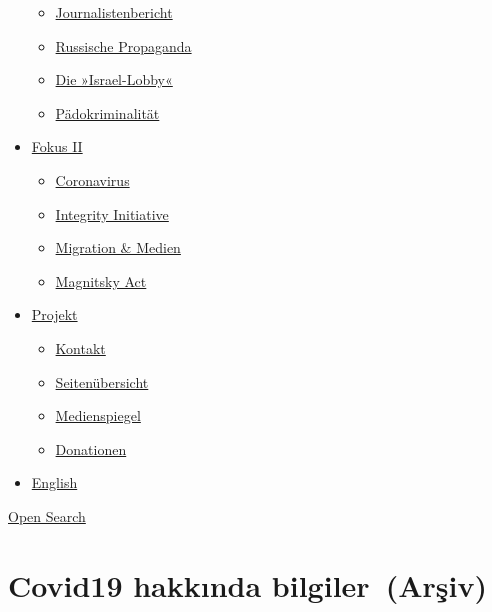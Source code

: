 \begin{itemize}
  \begin{itemize}
  \tightlist
  \item
    \href{https://swprs.org/bericht-eines-journalisten/}{Journalistenbericht}
  \item
    \href{https://swprs.org/russische-propaganda/}{Russische Propaganda}
  \item
    \href{https://swprs.org/die-israel-lobby-fakten-und-mythen/}{Die
    »Israel-Lobby«}
  \item
    \href{https://swprs.org/geopolitik-und-paedokriminalitaet/}{Pädokriminalität}
  \end{itemize}
\item
  \href{https://swprs.org/migration-und-medien/}{Fokus II}

  \begin{itemize}
  \tightlist
  \item
    \href{https://swprs.org/covid-19-hinweis-ii/}{Coronavirus}
  \item
    \href{https://swprs.org/die-integrity-initiative/}{Integrity
    Initiative}
  \item
    \href{https://swprs.org/migration-und-medien/}{Migration \& Medien}
  \item
    \href{https://swprs.org/der-fall-magnitsky/}{Magnitsky Act}
  \end{itemize}
\item
  \href{https://swprs.org/kontakt/}{Projekt}

  \begin{itemize}
  \tightlist
  \item
    \href{https://swprs.org/kontakt/}{Kontakt}
  \item
    \href{https://swprs.org/uebersicht/}{Seitenübersicht}
  \item
    \href{https://swprs.org/medienspiegel/}{Medienspiegel}
  \item
    \href{https://swprs.org/donationen/}{Donationen}
  \end{itemize}
\item
  \href{https://swprs.org/contact/}{English}
\end{itemize}

\protect\hyperlink{}{Open Search}

\hypertarget{covid19-hakkux131nda-bilgiler-arux15fiv}{%
\section{Covid19 hakkında
bilgiler~(Arşiv)}\label{covid19-hakkux131nda-bilgiler-arux15fiv}}

